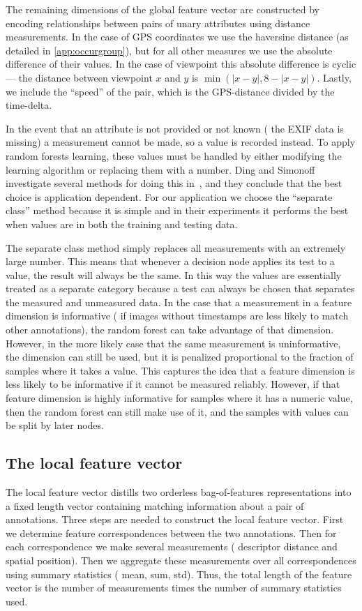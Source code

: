 The remaining dimensions of the global feature vector are constructed by encoding relationships between pairs of
  unary attributes using distance measurements.
In the case of GPS coordinates we use the haversine distance (as detailed in \cref{app:occurgroup}), but for all
  other measures we use the absolute difference of their values.
In the case of viewpoint this absolute difference is cyclic  --- \ie{} the distance between viewpoint $x$ and $y$
  is $\min(|x - y|, 8 - |x - y|)$.
Lastly, we include the ``speed'' of the pair, which is the GPS-distance divided by the time-delta.

In the event that an attribute is not provided or not known (\eg{} the EXIF data is missing) a measurement cannot
be made, so a \nan{} value is recorded instead. To apply random forests learning, these \nan{} values must be
handled by either modifying the learning algorithm or replacing them with a number. Ding and Simonoff investigate
several methods for doing this in~\cite{ding_investigation_2010}, and they conclude that the best choice is
application dependent. For our application we choose the ``separate class'' method because it is simple and in
their experiments it performs the best when \nan{} values are in both the training and testing data.

The separate class method simply replaces all \nan{} measurements with an extremely large number.
This means that whenever a decision node applies its test to a \nan{} value, the result will always be the same.
In this way the \nan{} values are essentially treated as a separate category because a test can always be chosen
  that separates the measured and unmeasured data.
In the case that a \nan{} measurement in a feature dimension is informative (\eg{} if images without timestamps
  are less likely to match other annotations), the random forest can take advantage of that dimension.
However, in the more likely case that the same \nan{} measurement is uninformative, the dimension can still be
  used, but it is penalized proportional to the fraction of samples where it takes a \nan{} value.
This captures the idea that a feature dimension is less likely to be informative if it cannot be measured
  reliably.
However, if that feature dimension is highly informative for samples where it has a numeric value, then the
  random forest can still make use of it, and the samples with \nan{} values can be split by later nodes.

\subsection{The local feature vector}
The local feature vector distills two orderless bag-of-features representations into a fixed length vector
  containing matching information about a pair of annotations.
Three steps are needed to construct the local feature vector.
First we determine feature correspondences between the two annotations.
Then for each correspondence we make several measurements (\eg{} descriptor distance and spatial position).
Then we aggregate these measurements over all correspondences using summary statistics (\eg{} mean, sum, std).
Thus, the total length of the feature vector is the number of measurements times the number of summary statistics
  used.

